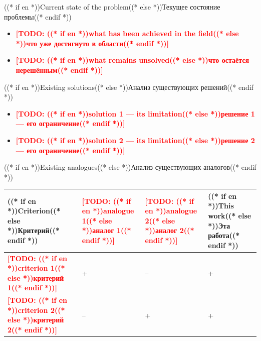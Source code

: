 \documentclass[aspectratio=169, 14pt]{beamer}
\newcommand{\todo}[1]{\textcolor{red}{\textbf{[TODO: #1]}}}
\begin{document}
\begin{frame}{((* if en *))Current state of the problem((* else *))Текущее состояние проблемы((* endif *))}
  \begin{itemize}
    \item \todo{((* if en *))what has been achieved in the field((* else *))что уже достигнуто в области((* endif *))}
    \item \todo{((* if en *))what remains unsolved((* else *))что остаётся нерешённым((* endif *))}
  \end{itemize}
\end{frame}

\begin{frame}{((* if en *))Existing solutions((* else *))Анализ существующих решений((* endif *))}
  \begin{itemize}
    \item \todo{((* if en *))solution 1 — its limitation((* else *))решение 1 — его ограничение((* endif *))}
    \item \todo{((* if en *))solution 2 — its limitation((* else *))решение 2 — его ограничение((* endif *))}
  \end{itemize}
\end{frame}

\begin{frame}{((* if en *))Existing analogues((* else *))Анализ существующих аналогов((* endif *))}
  \begin{center}
  \begin{tabularx}{\textwidth}{lXXX}
    \toprule
    ((* if en *))\textbf{Criterion}((* else *))\textbf{Критерий}((* endif *)) &
    \todo{((* if en *))analogue 1((* else *))аналог 1((* endif *))} &
    \todo{((* if en *))analogue 2((* else *))аналог 2((* endif *))} &
    ((* if en *))\textbf{This work}((* else *))\textbf{Эта работа}((* endif *)) \\
    \midrule
    \todo{((* if en *))criterion 1((* else *))критерий 1((* endif *))} & + & -- & + \\
    \todo{((* if en *))criterion 2((* else *))критерий 2((* endif *))} & -- & + & + \\
    \bottomrule
  \end{tabularx}
  \end{center}
\end{frame}
\end{document}
